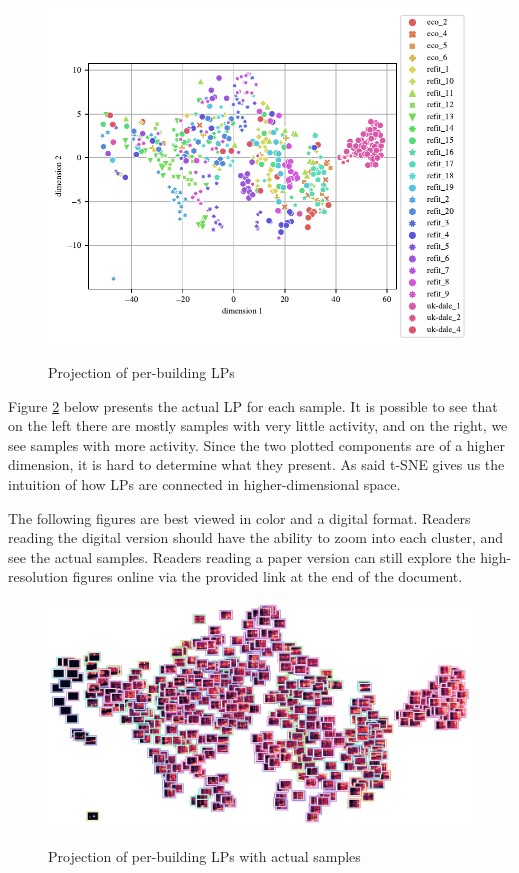 \begin{figure}[H]
	\centering
	\caption{Projection of per-building LPs}
	\includegraphics[]{Figures/TSNE/TSNE_per_building/scatter_per_building.pdf}
	\label{fig:tsne_scatter_non_norm_all}
\end{figure}

Figure \ref{fig:tsne_pb_img_scatter_allall} below presents the actual LP for each sample. 
It is possible to see that on the left there are mostly samples with very little activity,
and on the right, we see samples with more activity.
Since the two plotted components are of a higher dimension, it is hard to determine what they present.
As said t-SNE gives us the intuition of how LPs are connected in higher-dimensional space.

The following figures are best viewed in color and a digital format. 
Readers reading the digital version should have the ability to zoom into each cluster, and see the actual samples. 
Readers reading a paper version can still explore the high-resolution figures online via the provided link at the end of the document.

\begin{figure}[H]
	\centering
	\caption{Projection of per-building LPs with actual samples}
	\includegraphics[width=.9\textwidth]{Figures/TSNE/TSNE_per_building/img_scatter_per_building.png}
	\label{fig:tsne_pb_img_scatter_allall}
\end{figure}

